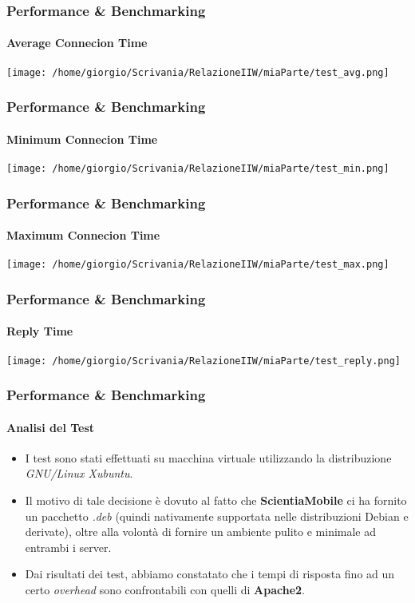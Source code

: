 \documentclass{beamer}
\begin{document}
\begin{frame}
\frametitle{Performance \& Benchmarking}
\framesubtitle{Average Connecion Time}
\begin{center}


\texttt{[image: /home/giorgio/Scrivania/RelazioneIIW/miaParte/test\_avg.png]}
\end{center}
\end{frame}



\begin{frame}
\frametitle{Performance \& Benchmarking}
\framesubtitle{Minimum Connecion Time}
\begin{center}


\texttt{[image: /home/giorgio/Scrivania/RelazioneIIW/miaParte/test\_min.png]}
\end{center}
\end{frame}




\begin{frame}
\frametitle{Performance \& Benchmarking}
\framesubtitle{Maximum Connecion Time}
\begin{center}


\texttt{[image: /home/giorgio/Scrivania/RelazioneIIW/miaParte/test\_max.png]}
\end{center}
\end{frame}




\begin{frame}
\frametitle{Performance \& Benchmarking}
\framesubtitle{Reply Time}
\begin{center}


\texttt{[image: /home/giorgio/Scrivania/RelazioneIIW/miaParte/test\_reply.png]}
\end{center}
\end{frame}






\begin{frame}
\frametitle{Performance \& Benchmarking}
\framesubtitle{Analisi del Test}

\begin{itemize}
\item I test sono stati effettuati su macchina virtuale utilizzando la distribuzione \textit{GNU/Linux Xubuntu}.
\item Il motivo di tale decisione è dovuto
al fatto che \textbf{ScientiaMobile} ci ha fornito un pacchetto \textit{.deb} (quindi nativamente
supportata nelle distribuzioni Debian e derivate), oltre alla volontà di fornire un
ambiente pulito e minimale ad entrambi i server.
\item Dai risultati dei test, abbiamo constatato che i tempi di risposta fino ad un certo \textit{overhead} sono confrontabili con quelli di \textbf{Apache2}.
\end{itemize}
\end{frame}
\end{document}
